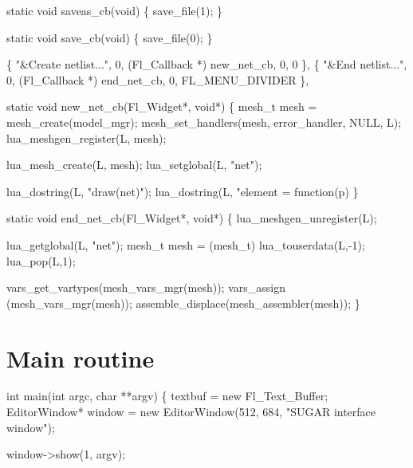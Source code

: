 static void saveas_cb(void) 
\{
    save_file(1);
\}

static void save_cb(void) 
\{
    save_file(0);
\}

\nwendcode{}\nwdocspar

\nwenddocs{}\endmoddef
\{ "&Create netlist...", 0, (Fl_Callback *) new_net_cb, 0, 0 \}, 
\{ "&End netlist...",    0, (Fl_Callback *) end_net_cb, 0, 
                        FL_MENU_DIVIDER \}, 

\nwendcode{}\nwdocspar

\nwenddocs{}\plusendmoddef
static void new_net_cb(Fl_Widget*, void*)
\{
    mesh_t mesh = mesh_create(model_mgr);
    mesh_set_handlers(mesh, error_handler, NULL, L);
    lua_meshgen_register(L, mesh);

    lua_mesh_create(L, mesh);
    lua_setglobal(L, "net");

    lua_dostring(L, "draw(net)");
    lua_dostring(L, "element = function(p) %
\}

static void end_net_cb(Fl_Widget*, void*)
\{
    lua_meshgen_unregister(L);

    lua_getglobal(L, "net");
    mesh_t mesh = (mesh_t) lua_touserdata(L,-1);
    lua_pop(L,1);

    vars_get_vartypes(mesh_vars_mgr(mesh));
    vars_assign      (mesh_vars_mgr(mesh));
    assemble_displace(mesh_assembler(mesh));
\}

\nwendcode{}\nwdocspar

\section{Main routine}

\nwenddocs{}\endmoddef
int main(int argc, char **argv) 
\{
    textbuf = new Fl_Text_Buffer;
    EditorWindow* window = 
        new EditorWindow(512, 684, "SUGAR interface window");

    window->show(1, argv);

